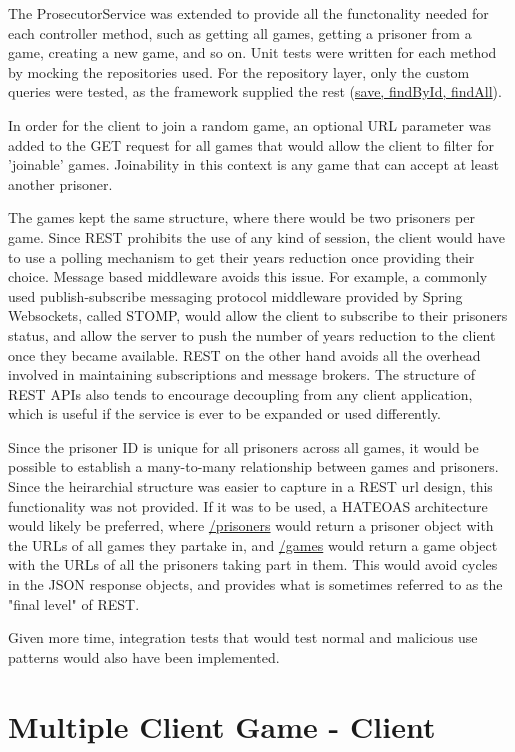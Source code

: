 \documentclass[12pt]{article}
\begin{document}
The ProsecutorService was extended to provide all the functonality needed for each controller method, such as getting all games, getting a prisoner from a game, creating a new game, and so on. Unit tests were written for each method by mocking the repositories used. For the repository layer, only the custom queries were tested, as the framework supplied the rest (\url{save, findById, findAll}). 

In order for the client to join a random game, an optional URL parameter was added to the GET request for all games that would allow the client to filter for 'joinable' games. Joinability in this context is any game that can accept at least another prisoner.

The games kept the same structure, where there would be two prisoners per game. Since REST prohibits the use of any kind of session, the client would have to use a polling mechanism to get their years reduction once providing their choice. Message based middleware avoids this issue. For example, a commonly used publish-subscribe messaging protocol middleware provided by Spring Websockets, called STOMP, would allow the client to subscribe to their prisoners status, and allow the server to push the number of years reduction to the client once they became available. REST on the other hand avoids all the overhead involved in maintaining subscriptions and message brokers. The structure of REST APIs also tends to encourage decoupling from any client application, which is useful if the service is ever to be expanded or used differently.

Since the prisoner ID is unique for all prisoners across all games, it would be possible to establish a many-to-many relationship between games and prisoners. Since the heirarchial structure was easier to capture in a REST url design, this functionality was not provided. If it was to be used, a HATEOAS architecture would likely be preferred, where \url{/prisoners} would return a prisoner object with the URLs of all games they partake in, and \url{/games} would return a game object with the URLs of all the prisoners taking part in them. This would avoid cycles in the JSON response objects, and provides what is sometimes referred to as the "final level" of REST.

Given more time, integration tests that would test normal and malicious use patterns would also have been implemented. 

\part{Multiple Client Game - Client}
\end{document}

